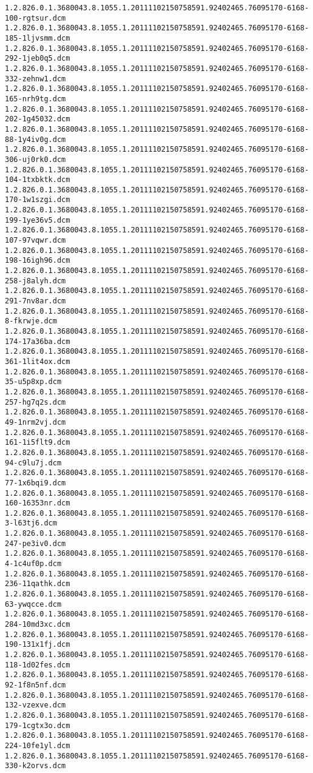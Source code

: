 \begin{lstlisting}
1.2.826.0.1.3680043.8.1055.1.20111102150758591.92402465.76095170-6168-100-rgtsur.dcm 1.2.826.0.1.3680043.8.1055.1.20111102150758591.92402465.76095170-6168-185-1ljvsmm.dcm 1.2.826.0.1.3680043.8.1055.1.20111102150758591.92402465.76095170-6168-292-1jeb0q5.dcm 1.2.826.0.1.3680043.8.1055.1.20111102150758591.92402465.76095170-6168-332-zehnw1.dcm 1.2.826.0.1.3680043.8.1055.1.20111102150758591.92402465.76095170-6168-165-nrh9tg.dcm 1.2.826.0.1.3680043.8.1055.1.20111102150758591.92402465.76095170-6168-202-1g45032.dcm 1.2.826.0.1.3680043.8.1055.1.20111102150758591.92402465.76095170-6168-88-1y4iv0g.dcm 1.2.826.0.1.3680043.8.1055.1.20111102150758591.92402465.76095170-6168-306-uj0rk0.dcm 1.2.826.0.1.3680043.8.1055.1.20111102150758591.92402465.76095170-6168-104-1txbktk.dcm 1.2.826.0.1.3680043.8.1055.1.20111102150758591.92402465.76095170-6168-170-1w1szgi.dcm 1.2.826.0.1.3680043.8.1055.1.20111102150758591.92402465.76095170-6168-199-1ye36v5.dcm 1.2.826.0.1.3680043.8.1055.1.20111102150758591.92402465.76095170-6168-107-97vqwr.dcm 1.2.826.0.1.3680043.8.1055.1.20111102150758591.92402465.76095170-6168-198-16igh96.dcm 1.2.826.0.1.3680043.8.1055.1.20111102150758591.92402465.76095170-6168-258-j8alyh.dcm 1.2.826.0.1.3680043.8.1055.1.20111102150758591.92402465.76095170-6168-291-7nv8ar.dcm 1.2.826.0.1.3680043.8.1055.1.20111102150758591.92402465.76095170-6168-8-fkrwje.dcm 1.2.826.0.1.3680043.8.1055.1.20111102150758591.92402465.76095170-6168-174-17a36ba.dcm 1.2.826.0.1.3680043.8.1055.1.20111102150758591.92402465.76095170-6168-361-1lit4ox.dcm 1.2.826.0.1.3680043.8.1055.1.20111102150758591.92402465.76095170-6168-35-u5p8xp.dcm 1.2.826.0.1.3680043.8.1055.1.20111102150758591.92402465.76095170-6168-257-hg7q2s.dcm 1.2.826.0.1.3680043.8.1055.1.20111102150758591.92402465.76095170-6168-49-1nrm2vj.dcm 1.2.826.0.1.3680043.8.1055.1.20111102150758591.92402465.76095170-6168-161-1i5flt9.dcm 1.2.826.0.1.3680043.8.1055.1.20111102150758591.92402465.76095170-6168-94-c9lu7j.dcm 1.2.826.0.1.3680043.8.1055.1.20111102150758591.92402465.76095170-6168-77-1x6bqi9.dcm 1.2.826.0.1.3680043.8.1055.1.20111102150758591.92402465.76095170-6168-160-16353nr.dcm 1.2.826.0.1.3680043.8.1055.1.20111102150758591.92402465.76095170-6168-3-l63tj6.dcm 1.2.826.0.1.3680043.8.1055.1.20111102150758591.92402465.76095170-6168-247-pe3iv0.dcm 1.2.826.0.1.3680043.8.1055.1.20111102150758591.92402465.76095170-6168-4-1c4uf0p.dcm 1.2.826.0.1.3680043.8.1055.1.20111102150758591.92402465.76095170-6168-236-11qathk.dcm 1.2.826.0.1.3680043.8.1055.1.20111102150758591.92402465.76095170-6168-63-ywqcce.dcm 1.2.826.0.1.3680043.8.1055.1.20111102150758591.92402465.76095170-6168-284-10md3xc.dcm 1.2.826.0.1.3680043.8.1055.1.20111102150758591.92402465.76095170-6168-190-131x1fj.dcm 1.2.826.0.1.3680043.8.1055.1.20111102150758591.92402465.76095170-6168-118-1d02fes.dcm 1.2.826.0.1.3680043.8.1055.1.20111102150758591.92402465.76095170-6168-92-1f8n5nf.dcm 1.2.826.0.1.3680043.8.1055.1.20111102150758591.92402465.76095170-6168-132-vzexve.dcm 1.2.826.0.1.3680043.8.1055.1.20111102150758591.92402465.76095170-6168-179-1cgtx3o.dcm 1.2.826.0.1.3680043.8.1055.1.20111102150758591.92402465.76095170-6168-224-10fe1yl.dcm 1.2.826.0.1.3680043.8.1055.1.20111102150758591.92402465.76095170-6168-330-k2orvs.dcm 
\end{lstlisting}
